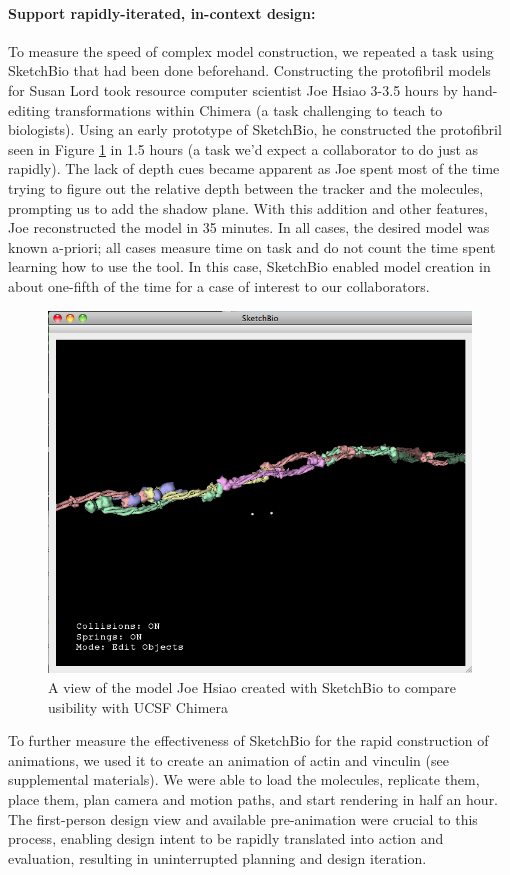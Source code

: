 \documentclass[twocolumn]{bmcart}%
\begin{document}
\paragraph*{Support rapidly-iterated, in-context design:}
To measure the speed of complex model construction, we repeated a task using SketchBio that had been done beforehand.
Constructing the protofibril models for Susan Lord took resource computer scientist Joe Hsiao 3-3.5 hours by hand-editing transformations within Chimera (a task challenging to teach to biologists).
Using an early prototype of SketchBio, he constructed the protofibril seen in Figure \ref{fig:joe_test} in 1.5 hours (a task we'd expect a collaborator to do just as rapidly).
The lack of depth cues became apparent as Joe spent most of the time trying to figure out the relative depth between the tracker and the molecules, prompting us to add the shadow plane.
With this addition and other features, Joe reconstructed the model in 35 minutes.
In all cases, the desired model was known a-priori; all cases measure time on task and do not count the time spent learning how to use the tool.
In this case, SketchBio enabled model creation in about one-fifth of the time for a case of interest to our collaborators.

\begin{figure}[h]
\centering
\includegraphics[width=0.9\columnwidth]{joe_test.png}
\caption{A view of the model Joe Hsiao created with SketchBio to compare usibility with UCSF Chimera}
\label{fig:joe_test}
\end{figure}

To further measure the effectiveness of SketchBio for the rapid construction of animations, we used it to create an animation of actin and vinculin (see supplemental materials).
We were able to load the molecules, replicate them, place them, plan camera and motion paths, and start rendering in half an hour.
The first-person design view and available pre-animation were crucial to this process, enabling design intent to be rapidly translated into action and evaluation, resulting in uninterrupted planning and design iteration.
\end{document}
